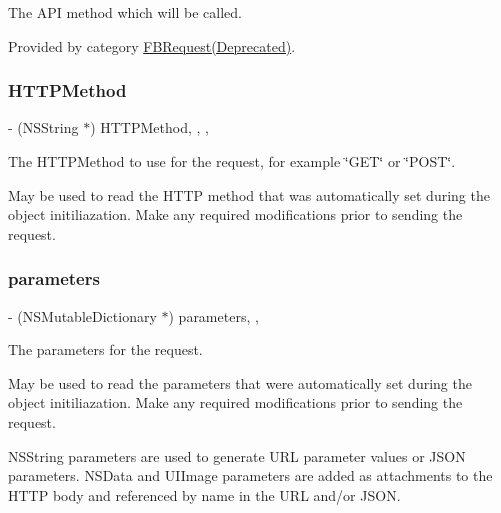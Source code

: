 The A\+PI method which will be called. 

Provided by category \hyperlink{categoryFBRequest_07Deprecated_08_af74fe5bc235b8895dbe0f051239649d6}{F\+B\+Request(\+Deprecated)}.

\mbox{\label{interfaceFBRequest_a234d79d710bbfa72a1bc3c4b0793def1}} 
\subsubsection{\texorpdfstring{H\+T\+T\+P\+Method}{HTTPMethod}}
{\footnotesize\ttfamily -\/ (N\+S\+String $\ast$) H\+T\+T\+P\+Method\hspace{0.3cm}{\ttfamily [read]}, {\ttfamily [write]}, {\ttfamily [nonatomic]}, {\ttfamily [copy]}}

The H\+T\+T\+P\+Method to use for the request, for example \char`\"{}\+G\+E\+T\char`\"{} or \char`\"{}\+P\+O\+S\+T\char`\"{}.

May be used to read the H\+T\+TP method that was automatically set during the object initiliazation. Make any required modifications prior to sending the request. \mbox{\label{interfaceFBRequest_a232db9ea9dc47acebd52ee9f8b2d3a9c}} 
\subsubsection{\texorpdfstring{parameters}{parameters}}
{\footnotesize\ttfamily -\/ (N\+S\+Mutable\+Dictionary $\ast$) parameters\hspace{0.3cm}{\ttfamily [read]}, {\ttfamily [nonatomic]}, {\ttfamily [retain]}}

The parameters for the request.

May be used to read the parameters that were automatically set during the object initiliazation. Make any required modifications prior to sending the request.

{\ttfamily N\+S\+String} parameters are used to generate U\+RL parameter values or J\+S\+ON parameters. {\ttfamily N\+S\+Data} and {\ttfamily U\+I\+Image} parameters are added as attachments to the H\+T\+TP body and referenced by name in the U\+RL and/or J\+S\+ON. \mbox{\label{interfaceFBRequest_abc65f409227938e45243e9aa31c3f1d5}} 
